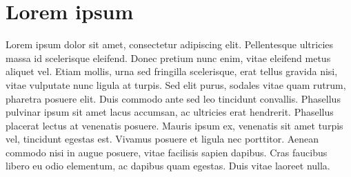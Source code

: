 \documentclass[twoside]{article}
\begin{document}
\section{Lorem ipsum}
Lorem ipsum dolor sit amet, consectetur adipiscing elit. Pellentesque ultricies massa id scelerisque eleifend. Donec pretium nunc enim, vitae eleifend metus aliquet vel. Etiam mollis, urna sed fringilla scelerisque, erat tellus gravida nisi, vitae vulputate nunc ligula at turpis. Sed elit purus, sodales vitae quam rutrum, pharetra posuere elit. Duis commodo ante sed leo tincidunt convallis. Phasellus pulvinar ipsum sit amet lacus accumsan, ac ultricies erat hendrerit. Phasellus placerat lectus at venenatis posuere. Mauris ipsum ex, venenatis sit amet turpis vel, tincidunt egestas est. Vivamus posuere et ligula nec porttitor. Aenean commodo nisi in augue posuere, vitae facilisis sapien dapibus. Cras faucibus libero eu odio elementum, ac dapibus quam egestas. Duis vitae laoreet nulla. 
\end{document}
